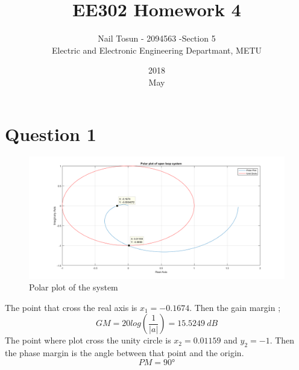 \documentclass[11pt]{report}
\title{EE302 Homework 4}
\date{2018\\ May}
\author{Nail Tosun - 2094563 -Section 5\\ Electric and Electronic Engineering Departmant, METU}
\begin{document}
\maketitle
\section*{Question 1}
\begin{figure}[H]
  \includegraphics[scale=0.7, center]{polarplot}
  \caption{Polar plot of the system}
  \label{fig:zero}
\end{figure}
The point that cross the real axis is $x_1 = -0.1674$. Then the gain margin ;
\[GM=20log(\frac{1}{|a|})=15.5249 \>dB\]
The point where plot cross the unity circle is $x_2 =0.01159$ and $y_2=-1$. Then the phase margin is the angle between that point and the origin. 
\[PM=\ang{90}\]
\end{document}
